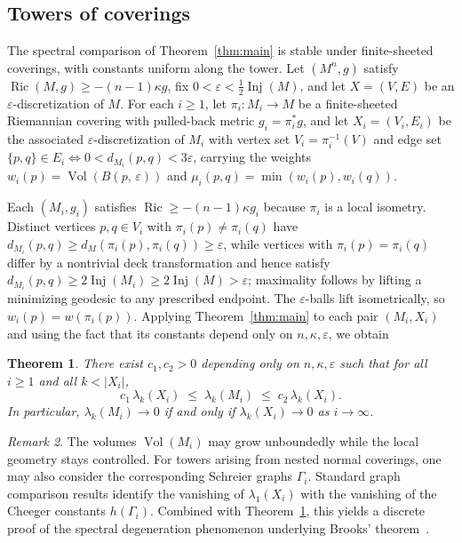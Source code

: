 \documentclass[10pt,reqno]{amsart}
\newtheorem{theorem}{Theorem}[section]
\theoremstyle{remark}
\newtheorem{remark}[theorem]{Remark}
\newcommand{\Ric}{\operatorname{Ric}}
\newcommand{\Inj}{\operatorname{Inj}}
\newcommand{\Vol}{\operatorname{Vol}}
\newcommand{\B}[2]{B(#1,\,#2)}
\begin{document}
\subsection{Towers of coverings}
\label{subsec:tower}

The spectral comparison of Theorem~\ref{thm:main} is stable under
finite-sheeted coverings, with constants uniform along the tower. Let
$(M^n,g)$ satisfy $\Ric(M,g)\geq-(n-1)\kappa g$, fix
$0<\varepsilon<\tfrac{1}{2}\Inj(M)$, and let $X=(V,E)$ be an
$\varepsilon$-discretization of $M$. For each $i\geq 1$, let
$\pi_i:M_i\to M$ be a finite-sheeted Riemannian covering with
pulled-back metric $g_i=\pi_i^*g$, and let $X_i=(V_i,E_i)$ be the
associated $\varepsilon$-discretization of $M_i$ with vertex set $V_i=\pi_i^{-1}(V)$ and edge
set $\{p,q\}\in E_i\iff 0<d_{M_i}(p,q)<3\varepsilon$, carrying the
weights $w_i(p)=\Vol(\B{p}{\varepsilon})$ and
$\mu_i(p,q)=\min(w_i(p),w_i(q))$.

Each $(M_i,g_i)$ satisfies $\Ric\geq-(n-1)\kappa g_i$ because $\pi_i$
is a local isometry. Distinct vertices $p,q\in V_i$ with
$\pi_i(p)\neq\pi_i(q)$ have $d_{M_i}(p,q)\geq d_M(\pi_i(p),\pi_i(q))
\geq\varepsilon$, while vertices with $\pi_i(p)=\pi_i(q)$ differ by a
nontrivial deck transformation and hence satisfy
$d_{M_i}(p,q)\geq 2\Inj(M_i)\geq 2\Inj(M)>\varepsilon$; maximality
follows by lifting a minimizing geodesic to any prescribed endpoint.
The $\varepsilon$-balls lift isometrically, so $w_i(p)=w(\pi_i(p))$.
Applying Theorem~\ref{thm:main} to each pair $(M_i,X_i)$ and using the
fact that its constants depend only on $n,\kappa,\varepsilon$, we obtain

\begin{theorem}
\label{thm:tower}
There exist $c_1,c_2>0$ depending only on $n,\kappa,\varepsilon$ such
that for all $i\geq 1$ and all $k<|X_i|$,
\[
  c_1\,\lambda_k(X_i)\;\leq\;\lambda_k(M_i)\;\leq\;c_2\,\lambda_k(X_i).
\]
In particular, $\lambda_k(M_i)\to 0$ if and only if
$\lambda_k(X_i)\to 0$ as $i\to\infty$.
\end{theorem}

\begin{remark}
\label{rem:brooks}
The volumes $\Vol(M_i)$ may grow unboundedly while the local geometry
stays controlled. For towers arising from nested normal coverings, one may also consider
the corresponding Schreier graphs $\Gamma_i$. Standard graph
comparison results identify the vanishing of $\lambda_1(X_i)$ with the
vanishing of the Cheeger constants $h(\Gamma_i)$. Combined with
Theorem~\ref{thm:tower}, this yields a discrete proof of the spectral
degeneration phenomenon underlying Brooks'
theorem~\cite{Brooks1986}.
\end{remark}
\end{document}
